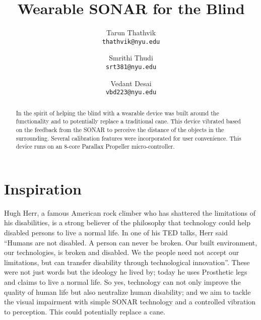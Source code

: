 \documentclass[twoside,11pt,letter]{article}
\title{\textbf{Wearable SONAR for the Blind}}
\author{\normalsize
  Tarun Thathvik\\
  \normalsize
  \texttt{thathvik@nyu.edu}
  \and
  \normalsize
  Smrithi Thudi\\
  \normalsize
  \texttt{srt381@nyu.edu}
  \and
  \normalsize
  Vedant Desai\\
  \normalsize
  \texttt{vbd223@nyu.edu}
}
\date{}
\begin{document}
\maketitle
\begin{abstract}
In the spirit of helping the blind with a wearable device was built around the functionality and to potentially replace a traditional cane. This device vibrated based on the feedback from the SONAR to perceive the distance of the objects in the surrounding. Several calibration features were incorporated for user convenience. This device runs on an 8-core Parallax Propeller micro-controller.
\end{abstract}


\section{Inspiration}
Hugh Herr, a famous American rock climber who has shattered the limitations of his disabilities, is a strong believer of the philosophy that technology could help disabled persons to live a normal life. In one of his TED talks, Herr said “Humans are not disabled. A person can never be broken. Our built environment, our technologies, is broken and disabled. We the people need not accept our limitations, but can transfer disability through technological innovation”. These were not just words but the ideology he lived by; today he uses Prosthetic legs and claims to live a normal life. So yes, technology can not only improve the quality of human life but also neutralize human disability; and we aim to tackle the visual impairment with simple SONAR technology and a controlled vibration to perception. This could potentially replace a cane.
\end{document}
